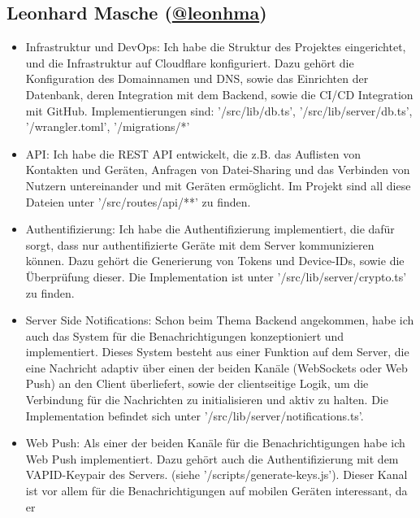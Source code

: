 \documentclass[a4paper]{article}
\begin{document}
\subsection{Leonhard Masche (\href{https://github.com/leonhma}{@leonhma})}
\begin{itemize}
      \item Infrastruktur und DevOps: Ich habe die Struktur des Projektes
            eingerichtet, und die Infrastruktur auf Cloudflare konfiguriert.
            Dazu gehört die Konfiguration des Domainnamen und DNS, sowie das
            Einrichten der Datenbank, deren Integration mit dem Backend, sowie
            die CI/CD Integration mit GitHub. Implementierungen sind:
            '/src/lib/db.ts', '/src/lib/server/db.ts', '/wrangler.toml',
            '/migrations/*'
      \item API: Ich habe die REST API entwickelt, die z.B. das Auflisten von
            Kontakten und Geräten, Anfragen von Datei-Sharing und das Verbinden
            von Nutzern untereinander und mit Geräten ermöglicht. Im Projekt
            sind all diese Dateien unter '/src/routes/api/**' zu finden.
      \item Authentifizierung: Ich habe die Authentifizierung implementiert, die
            dafür sorgt, dass nur authentifizierte Geräte mit dem Server
            kommunizieren können. Dazu gehört die Generierung von Tokens und
            Device-IDs, sowie die Überprüfung dieser. Die Implementation ist
            unter '/src/lib/server/crypto.ts' zu finden.
      \item Server Side Notifications: Schon beim Thema Backend angekommen, habe
            ich auch das System für die Benachrichtigungen konzeptioniert und
            implementiert. Dieses System besteht aus einer Funktion auf dem
            Server, die eine Nachricht adaptiv über einen der beiden Kanäle
            (WebSockets oder Web Push) an den Client überliefert, sowie der
            clientseitige Logik, um die Verbindung für die Nachrichten zu
            initialisieren und aktiv zu halten. Die Implementation befindet sich
            unter '/src/lib/server/notifications.ts'.
      \item Web Push: Als einer der beiden Kanäle für die Benachrichtigungen
            habe ich Web Push implementiert. Dazu gehört auch die
            Authentifizierung mit dem VAPID-Keypair des Servers. (siehe
            '/scripts/generate-keys.js'). Dieser Kanal ist vor allem für die
            Benachrichtigungen auf mobilen Geräten interessant, da er

\end{itemize}
\end{document}
